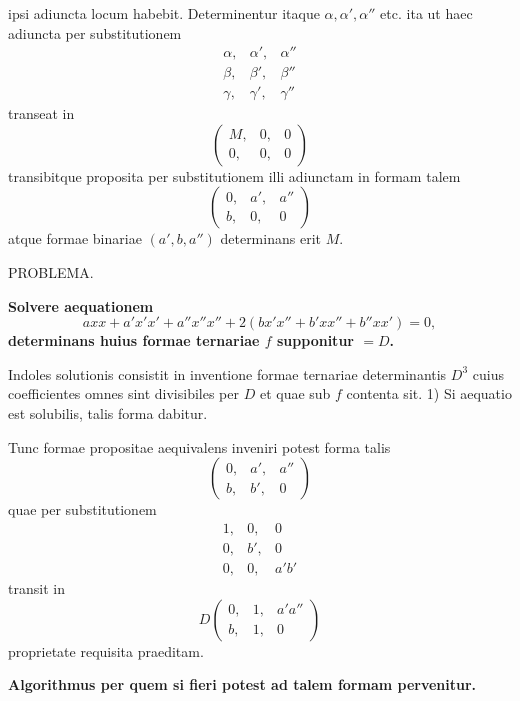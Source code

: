 ipsi adiuncta locum habebit. Determinentur itaque $\alpha,\alpha',\alpha''$ etc. ita ut haec
adiuncta per substitutionem
\[
\begin{array}{ccc}\alpha,&\alpha',&\alpha''\\\beta,&\beta',&\beta''\\\gamma,&\gamma',&\gamma''\end{array}
\]
\noindent transeat in
\[
\left(\begin{array}{ccc}M,&0,&0\\0,&0,&0\end{array}\right)
\]
\noindent transibitque proposita per substitutionem illi adiunctam in formam talem
\[
\left(\begin{array}{ccc}0,&a',&a''\\b,&0,&0\end{array}\right)
\]
\noindent atque formae binariae $(a',b,a'')$ determinans erit $M$.
\begin{center}PROBLEMA.\par\medskip\textbf{Solvere aequationem}
\[
axx+a'x'x'+a''x''x''+2(bx'x''+b'xx''+b''xx')=0,
\]
\textbf{determinans huius formae ternariae $f$ supponitur $=D$.}\end{center}
\noindent\hspace*{\parindent}Indoles solutionis consistit in inventione formae ternariae determinantis
$D^3$ cuius coefficientes omnes sint divisibiles per $D$ et quae sub $f$ contenta sit.
\clearpage
{}
\noindent\hspace*{\parindent}1) Si aequatio est solubilis, talis forma dabitur.\par
\noindent Tunc formae propositae aequivalens inveniri potest forma talis
\[
\left(\begin{array}{ccc}0,&a',&a''\\b,&b',&0\end{array}\right)
\]
\noindent quae per substitutionem
\[
\begin{array}{ccc}1,&0,&0\\0,&b',&0\\0,&0,&a'b'\end{array}
\]
\noindent transit in
\[
D\left(\begin{array}{ccc}0,&1,&a'a''\\b,&1,&0\end{array}\right)
\]
\noindent proprietate requisita praeditam.
\begin{center}\textbf{Algorithmus per quem si fieri potest ad talem formam pervenitur.}\end{center}
